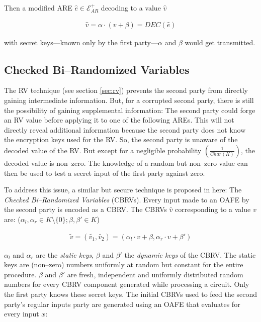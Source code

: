 \documentclass[12pt, a4paper]{article}
\begin{document}
\noindent{}Then a modified ARE $\hat{e} \in \mathcal{E}_{AR}^+$ decoding to a
value $\hat{v}$

\begin{align*}
\hat{v} = \alpha \cdot (v + \beta) = DEC(\hat{e})
\end{align*}

\noindent{}with secret keys---known only by the first party---$\alpha$ and
$\beta$ would get transmitted.


\subsection{Checked Bi--Randomized Variables}
\label{sec:cbrv}

The RV technique (see section \ref{sec:rv}) prevents the
second party from directly gaining intermediate information. But, for a
corrupted second party, there is still the possibility of gaining supplemental
information: The second party could forge an RV value before applying it to one
of the following AREs. This will not directly reveal additional information
because the second party does not know the encryption keys used for the RV. So,
the second party is unaware of the decoded value of the RV. But except for a
negligible probability $\left(\frac{1}{Char(K)}\right)$, the decoded value is
non--zero.  The knowledge of a random but non--zero value can then be used to
test a secret input of the first party against zero. 

To address this issue, a similar but secure technique is proposed in here: The
\emph{Checked Bi--Randomized Variables} (CBRVs). Every input made to an OAFE by
the second party is encoded as a CBRV. The CBRVs $\hat{v}$ corresponding to a
value $v$ are: ($\alpha_l, \alpha_r \in K \setminus \{0\}; \beta, \beta' \in K$)

\begin{align*}
  \widetilde{v} = (\widetilde{v_1}, \widetilde{v_2}) =
  (\alpha_l \cdot v + \beta, \alpha_r \cdot v + \beta')
\end{align*}

\noindent{} $\alpha_l$ and $\alpha_r$ are the \emph{static keys}, $\beta$ and
$\beta'$ the \emph{dynamic keys} of the CBRV. The static keys are (non--zero)
numbers uniformly at random but constant for the entire procedure. $\beta$ and
$\beta'$ are fresh, independent and uniformly distributed random numbers for
every CBRV component generated while processing a circuit. Only the first party
knows these secret keys. The initial CBRVs used to feed the second party's
regular inputs party are generated using an OAFE that evaluates for every input
$x$:
\end{document}
